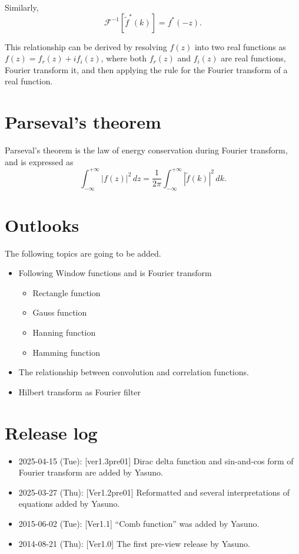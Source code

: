 \documentclass[a4paper]{article}
\newcommand{\intinfty}{\int^{+\infty}_{-\infty}\xspace}
\newcommand{\abs}[1]{\left|{#1}\right|\xspace}
\newcommand{\iftf}[1]{{\mathcal{F}^{-1}\left[#1\right]\xspace}}
\newcommand{\ftt}[1]{{\tilde{#1}\xspace}}
\begin{document}
Similarly,
\begin{equation}
	\iftf{\ftt{f}^*(k)} = f^*(-z).
\end{equation}

This relationship can be derived by resolving $f(z)$ into two real functions as $f(z) = f_r(z) + i f_i(z)$, where both $f_r(z)$ and $f_i(z)$ are real functions, Fourier transform it, and then applying the rule for the Fourier transform of a real function.

\section{Parseval’s theorem}
Parseval’s theorem is the law of energy conservation during Fourier transform, and is expressed as 
\begin{equation}
	\intinfty \abs{f(z)}^2 \, dz
	= \frac{1}{2\pi} \intinfty \abs{\ftt{f}(k)}^2  \, dk.
\end{equation}

\section*{Outlooks}
The following topics are going to be added.
\begin{itemize}
	\item Following Window functions and is Fourier transform
	\begin{itemize}
		\item Rectangle function
		\item Gauss function
		\item Hanning function
		\item Hamming function
	\end{itemize}
	\item The relationship between convolution and correlation functions.
	\item Hilbert transform as Fourier filter
\end{itemize}

\section*{Release log}
\begin{itemize}
\item 2025-04-15 (Tue): [ver1.3pre01] Dirac delta function and sin-and-cos form of Fourier transform are added by Yasuno.
\item 2025-03-27 (Thu): [Ver1.2pre01] Reformatted and several interpretations of equations added by Yasuno.
\item 2015-06-02 (Tue): [Ver1.1] ``Comb function'' was added by Yasuno.	
\item 2014-08-21 (Thu): [Ver1.0] The first pre-view release by Yasuno.
\end{itemize}
\end{document}
